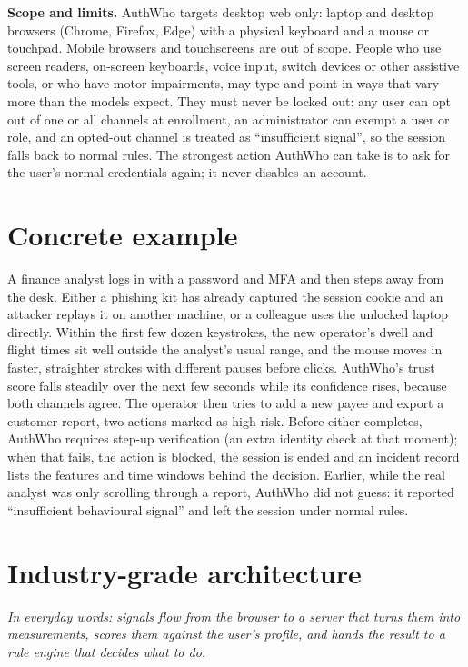 \documentclass[10pt,letterpaper]{article}
\begin{document}
\textbf{Scope and limits.} AuthWho targets desktop web only: laptop and desktop browsers (Chrome, Firefox, Edge) with a physical keyboard and a mouse or touchpad. Mobile browsers and touchscreens are out of scope. People who use screen readers, on-screen keyboards, voice input, switch devices or other assistive tools, or who have motor impairments, may type and point in ways that vary more than the models expect. They must never be locked out: any user can opt out of one or all channels at enrollment, an administrator can exempt a user or role, and an opted-out channel is treated as ``insufficient signal'', so the session falls back to normal rules. The strongest action AuthWho can take is to ask for the user's normal credentials again; it never disables an account.

\section{Concrete example}

A finance analyst logs in with a password and MFA and then steps away from the desk. Either a phishing kit has already captured the session cookie and an attacker replays it on another machine, or a colleague uses the unlocked laptop directly. Within the first few dozen keystrokes, the new operator's dwell and flight times sit well outside the analyst's usual range, and the mouse moves in faster, straighter strokes with different pauses before clicks. AuthWho's trust score falls steadily over the next few seconds while its confidence rises, because both channels agree. The operator then tries to add a new payee and export a customer report, two actions marked as high risk. Before either completes, AuthWho requires step-up verification (an extra identity check at that moment); when that fails, the action is blocked, the session is ended and an incident record lists the features and time windows behind the decision. Earlier, while the real analyst was only scrolling through a report, AuthWho did not guess: it reported ``insufficient behavioural signal'' and left the session under normal rules.

\section{Industry-grade architecture}

\emph{In everyday words: signals flow from the browser to a server that turns them into measurements, scores them against the user's profile, and hands the result to a rule engine that decides what to do.}
\end{document}
